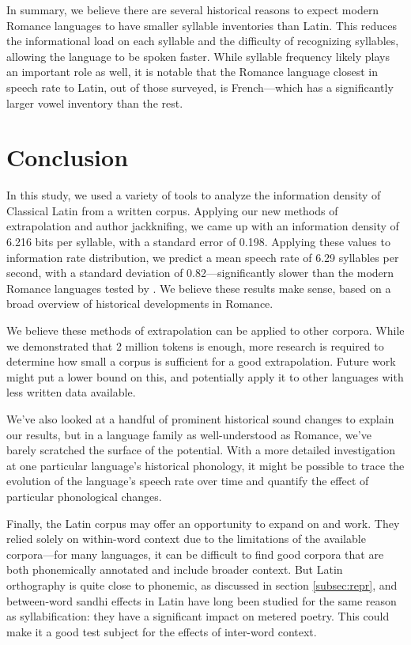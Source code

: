 \documentclass[12pt,twoside]{article}
\begin{document}
In summary, we believe there are several historical reasons to expect modern Romance languages to have smaller syllable inventories than Latin. This reduces the informational load on each syllable and the difficulty of recognizing syllables, allowing the language to be spoken faster. While syllable frequency likely plays an important role as well, it is notable that the Romance language closest in speech rate to Latin, out of those surveyed, is French---which has a significantly larger vowel inventory than the rest.

\section{Conclusion}
\label{sec:concl}

In this study, we used a variety of tools to analyze the information density of Classical Latin from a written corpus. Applying our new methods of extrapolation and author jackknifing, we came up with an information density of 6.216 bits per syllable, with a standard error of 0.198. Applying these values to  information rate distribution, we predict a mean speech rate of 6.29 syllables per second, with a standard deviation of 0.82---significantly slower than the modern Romance languages tested by \citeauthor{coupé}. We believe these results make sense, based on a broad overview of historical developments in Romance.

We believe these methods of extrapolation can be applied to other corpora. While we demonstrated that 2 million tokens is enough, more research is required to determine how small a corpus is sufficient for a good extrapolation. Future work might put a lower bound on this, and potentially apply it to other languages with less written data available.

We've also looked at a handful of prominent historical sound changes to explain our results, but in a language family as well-understood as Romance, we've barely scratched the surface of the potential. With a more detailed investigation at one particular language's historical phonology, it might be possible to trace the evolution of the language's speech rate over time and quantify the effect of particular phonological changes.

Finally, the Latin corpus may offer an opportunity to expand on \citet{oh} and  work. They relied solely on within-word context due to the limitations of the available corpora---for many languages, it can be difficult to find good corpora that are both phonemically annotated and include broader context. But Latin orthography is quite close to phonemic, as discussed in section \ref{subsec:repr}, and between-word sandhi effects in Latin have long been studied for the same reason as syllabification: they have a significant impact on metered poetry. This could make it a good test subject for the effects of inter-word context.
\end{document}
